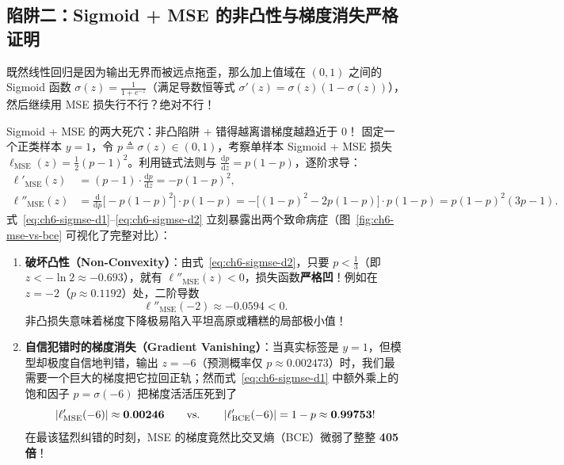 \subsection{陷阱二：Sigmoid + MSE 的非凸性与梯度消失严格证明}
\label{subsec:ch6-sigmse-fail}

既然线性回归是因为输出无界而被远点拖歪，那么加上值域在 $(0,1)$ 之间的 Sigmoid 函数 $\sigma(z) = \frac{1}{1+e^{-z}}$（满足导数恒等式 $\sigma'(z) = \sigma(z)(1-\sigma(z))$），然后继续用 MSE 损失行不行？绝对不行！

\begin{failBox}{Sigmoid + MSE 的两大死穴：非凸陷阱 + 错得越离谱梯度越趋近于 0！}
固定一个正类样本 $y = 1$，令 $p \triangleq \sigma(z) \in (0, 1)$，考察单样本 Sigmoid + MSE 损失 $\ell_{\text{MSE}}(z) = \frac{1}{2}(p - 1)^2$。利用链式法则与 $\frac{\mathrm{d}p}{\mathrm{d}z} = p(1 - p)$，逐阶求导：
\begin{align}
  \ell'_{\text{MSE}}(z)
  &= (p - 1)\cdot \frac{\mathrm{d}p}{\mathrm{d}z}
  = -p(1 - p)^2, \label{eq:ch6-sigmse-d1} \\
  \ell''_{\text{MSE}}(z)
  &= \frac{\mathrm{d}}{\mathrm{d}p}\!\big[-p(1 - p)^2\big]\cdot p(1 - p)
  = -\big[(1 - p)^2 - 2p(1 - p)\big]\cdot p(1 - p)
  = p(1 - p)^2(3p - 1). \label{eq:ch6-sigmse-d2}
\end{align}
式~\eqref{eq:ch6-sigmse-d1}--\eqref{eq:ch6-sigmse-d2} 立刻暴露出两个致命病症（图~\ref{fig:ch6-mse-vs-bce} 可视化了完整对比）：
\begin{enumerate}
  \item \textbf{破坏凸性（Non-Convexity）}：由式~\eqref{eq:ch6-sigmse-d2}，只要 $p < \frac{1}{3}$（即 $z < -\ln 2 \approx -0.693$），就有 $\ell''_{\text{MSE}}(z) < 0$，损失函数\textbf{严格凹}！例如在 $z = -2$（$p \approx 0.1192$）处，二阶导数
  \[
    \ell''_{\text{MSE}}(-2) \approx \mathbf{-0.0594} < 0.
  \]
  非凸损失意味着梯度下降极易陷入平坦高原或糟糕的局部极小值！
  \item \textbf{自信犯错时的梯度消失（Gradient Vanishing）}：当真实标签是 $y=1$，但模型却极度自信地判错，输出 $z = -6$（预测概率仅 $p \approx 0.002473$）时，我们最需要一个巨大的梯度把它拉回正轨；然而式~\eqref{eq:ch6-sigmse-d1} 中额外乘上的饱和因子 $p = \sigma(-6)$ 把梯度活活压死到了
  \[
    \left|\ell'_{\text{MSE}}(-6)\right| \approx \mathbf{0.00246} \qquad \text{vs.} \qquad \left|\ell'_{\text{BCE}}(-6)\right| = 1 - p \approx \mathbf{0.99753}!
  \]
  在最该猛烈纠错的时刻，MSE 的梯度竟然比交叉熵（BCE）微弱了整整 \textbf{405 倍}！
\end{enumerate}
\end{failBox}

